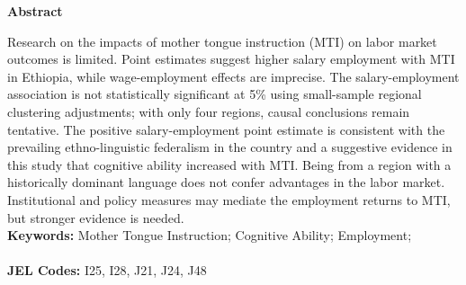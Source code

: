 \begin{center}
    \textbf{Abstract}
\end{center}
\doublespacing

Research on the impacts of mother tongue instruction (MTI) on labor market outcomes is limited. Point estimates suggest higher salary employment with MTI in Ethiopia, while wage-employment effects are imprecise. The salary-employment association is not statistically significant at 5\% using small-sample regional clustering adjustments; with only four regions, causal conclusions remain tentative. The positive salary-employment point estimate is consistent with the prevailing ethno-linguistic federalism in the country and a suggestive evidence in this study that cognitive ability increased with MTI. Being from a region with a historically dominant language does not confer advantages in the labor market. Institutional and policy measures may mediate the employment returns to MTI, but stronger evidence is needed.\\

\vspace{0in}
\noindent\textbf{Keywords:} Mother Tongue Instruction; Cognitive Ability; Employment;\\
\vspace{-.2in}\\
\noindent\textbf{JEL Codes:} I25, I28, J21, J24, J48\\

\bigskip

